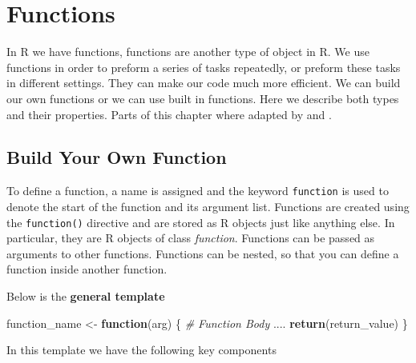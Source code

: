 \documentclass[
]{book}
\newenvironment{Shaded}{\begin{snugshade}}{\end{snugshade}}
\newcommand{\CommentTok}[1]{\textcolor[rgb]{0.56,0.35,0.01}{\textit{#1}}}
\newcommand{\ControlFlowTok}[1]{\textcolor[rgb]{0.13,0.29,0.53}{\textbf{#1}}}
\newcommand{\KeywordTok}[1]{\textcolor[rgb]{0.13,0.29,0.53}{\textbf{#1}}}
\newcommand{\NormalTok}[1]{#1}
\newcommand{\StringTok}[1]{\textcolor[rgb]{0.31,0.60,0.02}{#1}}
\begin{document}
\hypertarget{functions}{%
\chapter{Functions}\label{functions}}

In R we have functions, functions are another type of object in R. We use functions in order to preform a series of tasks repeatedly, or preform these tasks in different settings. They can make our code much more efficient. We can build our own functions or we can use built in functions. Here we describe both types and their properties. Parts of this chapter where adapted by \citet{r-func} and \citet{dummies2015}.

\hypertarget{build-your-own-function}{%
\section{Build Your Own Function}\label{build-your-own-function}}

To define a function, a name is assigned and the keyword \texttt{function} is used to denote the start of the function and its argument list. Functions are created using the \texttt{function()} directive and are stored as R objects just like anything else. In particular, they are R objects of class \emph{function}. Functions can be passed as arguments to other functions. Functions can be nested, so that you can define a function inside another function.

Below is the \textbf{general template}

\begin{Shaded}
\begin{Highlighting}[]
\NormalTok{function_name <-}\StringTok{ }\ControlFlowTok{function}\NormalTok{(arg) \{}
    \CommentTok{# Function Body}
\NormalTok{    ....}
    \KeywordTok{return}\NormalTok{(return_value)}
\NormalTok{\}}
\end{Highlighting}
\end{Shaded}

In this template we have the following key components
\end{document}
